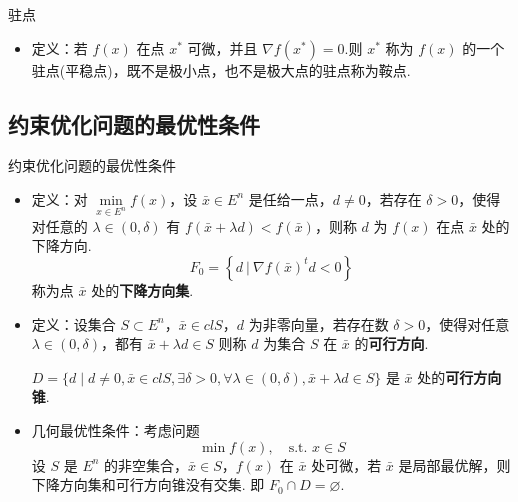 \begin{note}
    驻点\begin{itemize}
        \item 定义：若 $f(x)$ 在点 $x^*$ 可微，并且 $\nabla f(x^*) = 0$.则 $x^*$ 称为 $f(x)$ 的一个驻点(平稳点)，既不是极小点，也不是极大点的驻点称为鞍点.
    \end{itemize}
\end{note}

\subsection{约束优化问题的最优性条件}
\begin{note}
    约束优化问题的最优性条件
    \begin{itemize}
        \item 定义：对 $\underset{x \in E^n}{\min}f(x)$，设 $\bar{x} \in E^n$ 是任给一点，$d\neq 0$，若存在 $\delta > 0$，使得对任意的 $\lambda \in (0, \delta)$ 有 $f(\bar{x} + \lambda d) < f(\bar{x})$，则称 $d$ 为 $f(x)$ 在点 $\bar{x}$ 处的下降方向.\[F_0 = \left\{d\ |\ \nabla f(\bar{x})^td < 0\right\}\]称为点 $\bar{x}$ 处的\textbf{下降方向集}.
        \item 定义：设集合 $S \subset E^n$，$\bar{x} \in clS$，$d$ 为非零向量，若存在数 $\delta > 0$，使得对任意 $\lambda \in (0, \delta)$，都有 $\bar{x} + \lambda d \in S$ 则称 $d$ 为集合 $S$ 在 $\bar{x}$ 的\textbf{可行方向}. 
        
        $D=\{d \mid d \neq 0, \bar{x} \in c l S, \exists \delta>0, \forall \lambda \in(0, \delta), \bar{x}+\lambda d \in S\}$ 是 $\bar{x}$ 处的\textbf{可行方向锥}.
        \item 几何最优性条件：考虑问题\[\min f(x), \quad \text{s.t. } x \in S\]设 $S$ 是 $E^n$ 的非空集合，$\bar{x} \in S$，$f(x)$ 在 $\bar{x}$ 处可微，若 $\bar{x}$ 是局部最优解，则下降方向集和可行方向锥没有交集. 即 $F_0\cap D = \varnothing$.
    \end{itemize}
\end{note}

